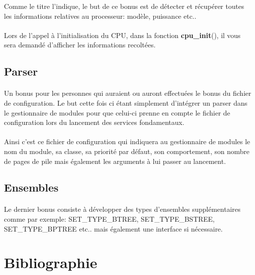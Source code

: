 \documentclass[10pt,a4wide]{article}
\begin{document}
Comme le titre l'indique, le but de ce bonus est de d\'etecter et r\'ecup\'erer
toutes les informations relatives au processeur: mod\`ele, puissance etc..

\paragraph{}

Lors de l'appel \`a l'initialisation du CPU, dans la fonction
\textbf{cpu\_init}(), il vous sera demand\'e d'afficher les informations
recolt\'ees.

\subsection{Parser}

\paragraph{}

Un bonus pour les personnes qui auraient ou auront effectu\'ees le bonus
du fichier de configuration. Le but cette fois ci \'etant simplement
d'int\'egrer un parser dans le gestionnaire de modules pour que celui-ci
prenne en compte le fichier de configuration lors du lancement des
services fondamentaux.

\paragraph{}

Ainsi c'est ce fichier de configuration qui indiquera au gestionnaire de
modules le nom du module, sa classe, sa priorit\'e par d\'efaut, son
comportement, son nombre de pages de pile mais \'egalement les arguments
\`a lui passer au lancement.

\subsection{Ensembles}

\paragraph{}

Le dernier bonus consiste \`a d\'evelopper des types d'ensembles
suppl\'ementaires comme par exemple: SET\_TYPE\_BTREE, SET\_TYPE\_BSTREE,
SET\_TYPE\_BPTREE etc.. mais \'egalement une interface si n\'ecessaire.

\section{Bibliographie}
\end{document}
